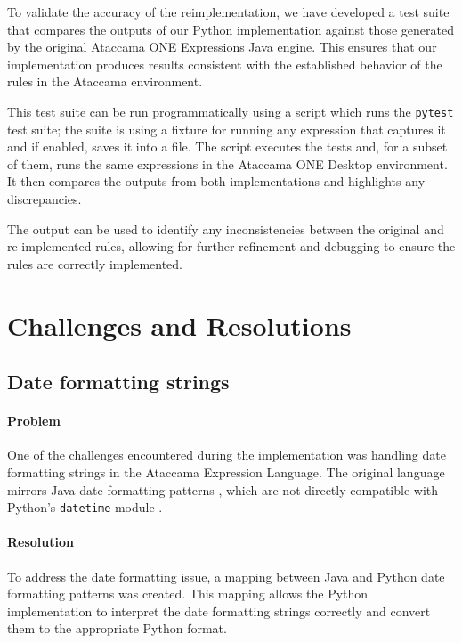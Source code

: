 To validate the accuracy of the reimplementation, we have developed a test suite that compares the outputs of our Python implementation against those generated by the original Ataccama ONE Expressions Java engine. This ensures that our implementation produces results consistent with the established behavior of the rules in the Ataccama environment.

This test suite can be run programmatically using a script which runs the \texttt{pytest} test suite; the suite is using a fixture for running any expression that captures it and if enabled, saves it into a file. The script executes the tests and, for a subset of them, runs the same expressions in the Ataccama ONE Desktop environment. It then compares the outputs from both implementations and highlights any discrepancies.

The output can be used to identify any inconsistencies between the original and re-implemented rules, allowing for further refinement and debugging to ensure the rules are correctly implemented.

\section{Challenges and Resolutions}

\subsection{Date formatting strings}
\paragraph{Problem}

One of the challenges encountered during the implementation was handling date formatting strings in the Ataccama Expression Language. The original language mirrors Java date formatting patterns \cite{datetimeformatter}, which are not directly compatible with Python’s \texttt{datetime} module \cite{datetime}.

\paragraph{Resolution}

To address the date formatting issue, a mapping between Java and Python date formatting patterns was created. This mapping allows the Python implementation to interpret the date formatting strings correctly and convert them to the appropriate Python format.

